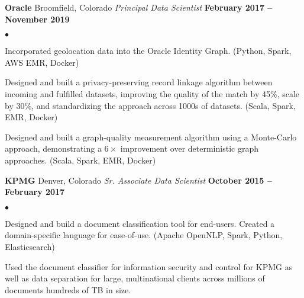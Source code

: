 \documentclass[margin,line, 11pt]{res}
\newenvironment{list2}{
  \begin{list}{$\bullet$}{%
      \setlength{\itemsep}{0in}
      \setlength{\parsep}{0in} \setlength{\parskip}{0in}
      \setlength{\topsep}{0in} \setlength{\partopsep}{0in}
      \setlength{\leftmargin}{0.2in}}}{\end{list}}
\begin{document}
\begin{resume}
\textbf{Oracle} \hfill Broomfield, Colorado\newline
\textit{Principal Data Scientist} \hfill \textbf{February 2017 -- November 2019}\newline
    \begin{list2}
    	\vspace*{-5mm}
      \item Incorporated geolocation data into the Oracle Identity Graph. (Python, Spark, AWS EMR, Docker)
    	\item Designed and built a privacy-preserving record linkage algorithm between incoming and fulfilled datasets, improving the quality of the match by 45\%, scale by 30\%, and standardizing the approach across 1000s of datasets. (Scala, Spark, EMR, Docker)
    	\item Designed and built a graph-quality measurement algorithm using a Monte-Carlo approach, demonstrating a $6\times$ improvement over deterministic graph approaches. (Scala, Spark, EMR, Docker)
    \end{list2}
\vspace*{-2mm}

\textbf{KPMG} \hfill Denver, Colorado\newline
\textit{Sr. Associate Data Scientist} \hfill \textbf{October 2015 -- February 2017}\newline
    \begin{list2}
    	\vspace*{-5mm}
      \item Designed and build a document classification tool for end-users. Created a domain-specific language for ease-of-use. (Apache OpenNLP, Spark, Python, Elasticsearch)
      \item Used the document classifier for information security and control for KPMG as well as data separation for large, multinational clients across millions of documents hundreds of TB in size.
    \end{list2}
\vspace*{-2mm}



\end{resume}
\end{document}
